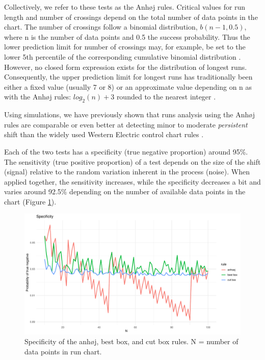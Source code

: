 Collectively, we refer to these tests as the Anhøj rules. Critical
values for run length and number of crossings depend on the total number
of data points in the chart. The number of crossings follow a binomial
distribution, \(b(n - 1, 0.5)\), where n is the number of data points
and 0.5 the success probability. Thus the lower prediction limit for
number of crossings may, for example, be set to the lower 5th percentile
of the corresponding cumulative binomial distribution \citep{chen2010}.
However, no closed form expression exists for the distribution of
longest runs. Consequently, the upper prediction limit for longest runs
has traditionally been either a fixed value (usually 7 or 8) or an
approximate value depending on n as with the Anhøj rules:
\(log_2(n) + 3\) rounded to the nearest integer \citep{schilling2012}.

Using simulations, we have previously shown that runs analysis using the
Anhøj rules are comparable or even better at detecting minor to moderate
\emph{persistent} shift than the widely used Western Electric control
chart rules \citep{anhoej2018}.

Each of the two tests has a specificity (true negative proportion)
around 95\%. The sensitivity (true positive proportion) of a test
depends on the size of the shift (signal) relative to the random
variation inherent in the process (noise). When applied together, the
sensitivity increases, while the specificity decreases a bit and varies
around 92.5\% depending on the number of available data points in the
chart (Figure \ref{figure:spec}).

\begin{figure}[htbp]
  \centering
  \includegraphics[width=\textwidth]{fig_spec.pdf}
  \caption{Specificity of the anhøj, best box, and cut box rules. N = number of data points in run chart. }
  \label{figure:spec}
\end{figure}

